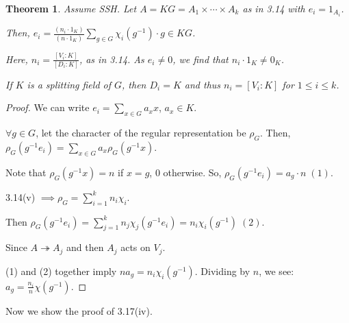 \documentclass{article}
\theoremstyle{definition}
\theoremstyle{plain}
\newtheorem{theorem}{Theorem}[section]
\theoremstyle{remark}
\begin{document}
    \begin{theorem}
        Assume SSH. Let \(A = KG = A_1 \times \cdots \times A_k\) as in 3.14 with \(e_i = 1_{A_i}\).
        
        Then, \(e_i = \frac{(n_i \cdot 1_K)}{(n\cdot 1_K)} \sum_{g\in G} \chi_i(g ^{-1}) \cdot g \in KG\).
        
        Here, \(n_i = \frac{[V_i : K]}{[D_i : K]}\), as in 3.14. As \(e_i \neq 0\), we find that \(n_i \cdot 1_K \neq 0_K\).

        If \(K\) is a splitting field of \(G\), then \(D_i = K\) and thus \(n_i = [V_i : K]\) for \(1 \leq i \leq k\).
    \end{theorem}

    \begin{proof}
        We can write \(e_i = \sum_{x\in G} a_x x\), \(a_x\in K\). 


        \(\forall g\in G\), let the character of the regular representation be \(\rho_G\). Then, \(\rho_G(g ^{-1} e_i) = \sum_{x\in G} a_x \rho_G(g ^{-1} x)\).

        Note that \(\rho_G(g ^{-1} x) = n\) if \(x = g\), \(0\) otherwise. So, \(\rho_G(g ^{-1} e_i) = a_g \cdot n\;(1)\).

        3.14(v) \(\implies \rho_G = \sum_{i=1}^k n_i \chi_i\).
        
        Then \(\rho_G(g^{-1} e_i) = \sum_{j=1}^k n_j \chi_j(g^{-1} e_i) = n_i \chi_i (g^{-1})\;(2)\).
        
        Since \(A \twoheadrightarrow A_j\) and then \(A_j\) acts on \(V_j\).

        (1) and (2) together imply \(n a_g = n_i \chi_i(g^{-1})\). Dividing by \(n\), we see: \(a_g = \frac{n_i}{n}\chi (g ^{-1})\).


    \end{proof}

    Now we show the proof of 3.17(iv).
\end{document}
